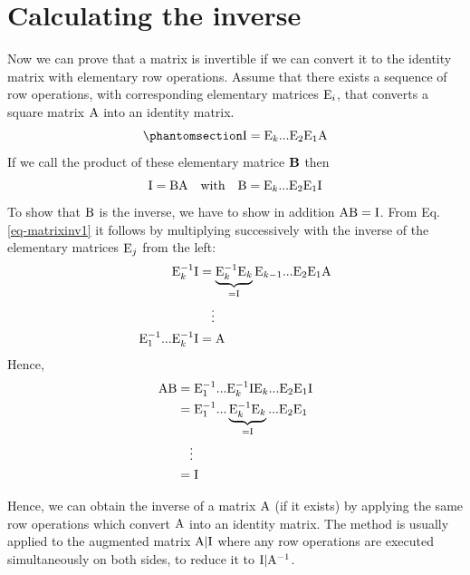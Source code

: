 \documentclass[
  a4paper,
  DIV=11,
  numbers=noendperiod,
  oneside]{scrreprt}
\theoremstyle{definition}
\theoremstyle{remark}
\begin{document}
\section{Calculating the inverse}\label{calculating-the-inverse}

Now we can prove that a matrix is invertible if we can convert it to the
identity matrix with elementary row operations. Assume that there exists
a sequence of row operations, with corresponding elementary matrices
\({\rm E}_i\), that converts a square matrix \({\rm A}\) into an
identity matrix.
\begin{equation}\phantomsection\label{eq-matrixinv1}{ {\rm I} = {\rm E}_{k} ... {\rm E}_{2} {\rm E}_{1} {\rm A} }\end{equation}
If we call the product of these elementary matrice \({\bf B}\) then
\[{\rm I} = {\rm B}  {\rm A}  \quad \text{with} \quad  {\rm B} = {\rm E}_{k} ... {\rm E}_{2} {\rm E}_{1} {\rm I} \]
To show that \({\rm B}\) is the inverse, we have to show in addition
\({\rm A}{\rm B} = {\rm I}\). From Eq. \ref{eq-matrixinv1} it follows by
multiplying successively with the inverse of the elementary matrices
\({\rm E}_{j}\) from the left: \[\begin{aligned}
{\rm E}_{k}^{-1}{\rm I} &=\underbrace{{\rm E}_{k}^{-1}{\rm E}_{k}}_{={\rm I}} {\rm E}_{k-1} ... {\rm E}_{2} {\rm E}_{1} {\rm A} \\
& \quad \vdots  \\
 {\rm E}_{1}^{-1}... {\rm E}_{k}^{-1}{\rm I} &=  {\rm A} 
 \end{aligned}\] Ηence, \[\begin{aligned}
 {\rm A}  {\rm B} & ={\rm E}_{1}^{-1}... {\rm E}_{k}^{-1}{\rm I}  {\rm E}_{k} ... {\rm E}_{2} {\rm E}_{1} {\rm I}   \\
 & ={\rm E}_{1}^{-1}... \underbrace{{\rm E}_{k}^{-1}{\rm E}_{k}}_{={\rm I}} ... {\rm E}_{2} {\rm E}_{1} \\
 & \quad \vdots \\
 &= {\rm I}
\end{aligned}\]

Hence, we can obtain the inverse of a matrix \({\rm A}\) (if it exists)
by applying the same row operations which convert \({\rm A}\) into an
identity matrix. The method is usually applied to the augmented matrix
\({\rm A} \vert  {\rm  I}\) where any row operations are executed
simultaneously on both sides, to reduce it to
\({\rm I} \vert  {\rm A}^{-1}\).
\end{document}
